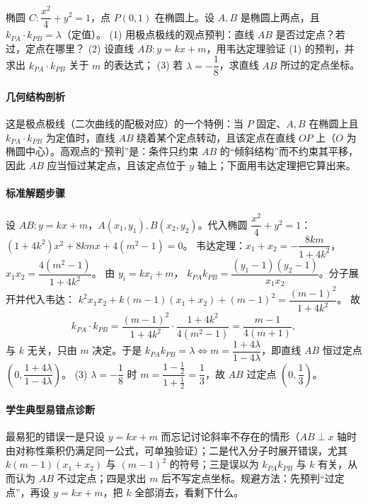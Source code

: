 \begin{problem}
椭圆 $C:\dfrac{x^2}{4}+y^2=1$，点 $P(0,1)$ 在椭圆上。设 $A,B$ 是椭圆上两点，且 $k_{PA}\cdot k_{PB}=\lambda$（定值）。
(1) 用极点极线的观点预判：直线 $AB$ 是否过定点？若过，定点在哪里？
(2) 设直线 $AB:y=kx+m$，用韦达定理验证 (1) 的预判，并求出 $k_{PA}\cdot k_{PB}$ 关于 $m$ 的表达式；
(3) 若 $\lambda=-\dfrac18$，求直线 $AB$ 所过的定点坐标。
\end{problem}
\begin{solution}
\paragraph{几何结构剖析}
这是极点极线（二次曲线的配极对应）的一个特例：当 $P$ 固定、$A,B$ 在椭圆上且 $k_{PA}\cdot k_{PB}$ 为定值时，直线 $AB$ 绕着某个定点转动，且该定点在直线 $OP$ 上（$O$ 为椭圆中心）。高观点的“预判”是：条件只约束 $AB$ 的“倾斜结构”而不约束其平移，因此 $AB$ 应当恒过某定点，且该定点位于 $y$ 轴上；下面用韦达定理把它算出来。
\paragraph{标准解题步骤}
设 $AB:y=kx+m$，$A(x_1,y_1),B(x_2,y_2)$。代入椭圆 $\dfrac{x^2}{4}+y^2=1$：
$(1+4k^2)x^2+8kmx+4(m^2-1)=0$。
韦达定理：$x_1+x_2=-\dfrac{8km}{1+4k^2}$，$x_1x_2=\dfrac{4(m^2-1)}{1+4k^2}$。
由 $y_i=kx_i+m$，
$k_{PA}k_{PB}=\dfrac{(y_1-1)(y_2-1)}{x_1x_2}$。分子展开并代入韦达：
$k^2x_1x_2+k(m-1)(x_1+x_2)+(m-1)^2=\dfrac{(m-1)^2}{1+4k^2}$。
故
$$k_{PA}\cdot k_{PB}=\frac{(m-1)^2}{1+4k^2}\cdot\frac{1+4k^2}{4(m^2-1)}=\frac{m-1}{4(m+1)},$$
与 $k$ 无关，只由 $m$ 决定。于是 $k_{PA}k_{PB}=\lambda\iff m=\dfrac{1+4\lambda}{1-4\lambda}$，即直线 $AB$ 恒过定点 $\left(0,\dfrac{1+4\lambda}{1-4\lambda}\right)$。
(3) $\lambda=-\dfrac18$ 时 $m=\dfrac{1-\frac12}{1+\frac12}=\dfrac13$，故 $AB$ 过定点 $\left(0,\dfrac13\right)$。
\paragraph{学生典型易错点诊断}
最易犯的错误一是只设 $y=kx+m$ 而忘记讨论斜率不存在的情形（$AB\perp x$ 轴时由对称性乘积仍满足同一公式，可单独验证）；二是代入分子时展开错误，尤其 $k(m-1)(x_1+x_2)$ 与 $(m-1)^2$ 的符号；三是误以为 $k_{PA}k_{PB}$ 与 $k$ 有关，从而认为 $AB$ 不过定点；四是求出 $m$ 后不写定点坐标。规避方法：先预判“过定点”，再设 $y=kx+m$，把 $k$ 全部消去，看剩下什么。
\end{solution}

